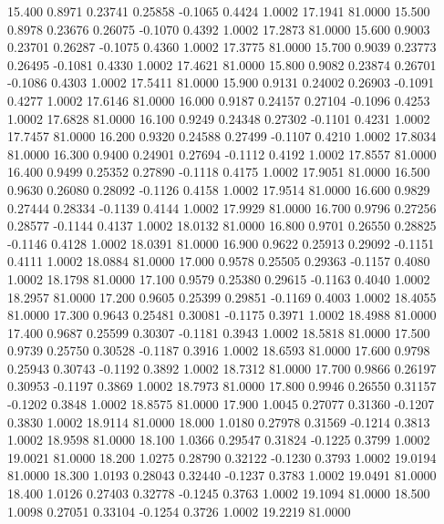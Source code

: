   15.400   0.8971   0.23741   0.25858  -0.1065   0.4424   1.0002  17.1941  81.0000
  15.500   0.8978   0.23676   0.26075  -0.1070   0.4392   1.0002  17.2873  81.0000
  15.600   0.9003   0.23701   0.26287  -0.1075   0.4360   1.0002  17.3775  81.0000
  15.700   0.9039   0.23773   0.26495  -0.1081   0.4330   1.0002  17.4621  81.0000
  15.800   0.9082   0.23874   0.26701  -0.1086   0.4303   1.0002  17.5411  81.0000
  15.900   0.9131   0.24002   0.26903  -0.1091   0.4277   1.0002  17.6146  81.0000
  16.000   0.9187   0.24157   0.27104  -0.1096   0.4253   1.0002  17.6828  81.0000
  16.100   0.9249   0.24348   0.27302  -0.1101   0.4231   1.0002  17.7457  81.0000
  16.200   0.9320   0.24588   0.27499  -0.1107   0.4210   1.0002  17.8034  81.0000
  16.300   0.9400   0.24901   0.27694  -0.1112   0.4192   1.0002  17.8557  81.0000
  16.400   0.9499   0.25352   0.27890  -0.1118   0.4175   1.0002  17.9051  81.0000
  16.500   0.9630   0.26080   0.28092  -0.1126   0.4158   1.0002  17.9514  81.0000
  16.600   0.9829   0.27444   0.28334  -0.1139   0.4144   1.0002  17.9929  81.0000
  16.700   0.9796   0.27256   0.28577  -0.1144   0.4137   1.0002  18.0132  81.0000
  16.800   0.9701   0.26550   0.28825  -0.1146   0.4128   1.0002  18.0391  81.0000
  16.900   0.9622   0.25913   0.29092  -0.1151   0.4111   1.0002  18.0884  81.0000
  17.000   0.9578   0.25505   0.29363  -0.1157   0.4080   1.0002  18.1798  81.0000
  17.100   0.9579   0.25380   0.29615  -0.1163   0.4040   1.0002  18.2957  81.0000
  17.200   0.9605   0.25399   0.29851  -0.1169   0.4003   1.0002  18.4055  81.0000
  17.300   0.9643   0.25481   0.30081  -0.1175   0.3971   1.0002  18.4988  81.0000
  17.400   0.9687   0.25599   0.30307  -0.1181   0.3943   1.0002  18.5818  81.0000
  17.500   0.9739   0.25750   0.30528  -0.1187   0.3916   1.0002  18.6593  81.0000
  17.600   0.9798   0.25943   0.30743  -0.1192   0.3892   1.0002  18.7312  81.0000
  17.700   0.9866   0.26197   0.30953  -0.1197   0.3869   1.0002  18.7973  81.0000
  17.800   0.9946   0.26550   0.31157  -0.1202   0.3848   1.0002  18.8575  81.0000
  17.900   1.0045   0.27077   0.31360  -0.1207   0.3830   1.0002  18.9114  81.0000
  18.000   1.0180   0.27978   0.31569  -0.1214   0.3813   1.0002  18.9598  81.0000
  18.100   1.0366   0.29547   0.31824  -0.1225   0.3799   1.0002  19.0021  81.0000
  18.200   1.0275   0.28790   0.32122  -0.1230   0.3793   1.0002  19.0194  81.0000
  18.300   1.0193   0.28043   0.32440  -0.1237   0.3783   1.0002  19.0491  81.0000
  18.400   1.0126   0.27403   0.32778  -0.1245   0.3763   1.0002  19.1094  81.0000
  18.500   1.0098   0.27051   0.33104  -0.1254   0.3726   1.0002  19.2219  81.0000
